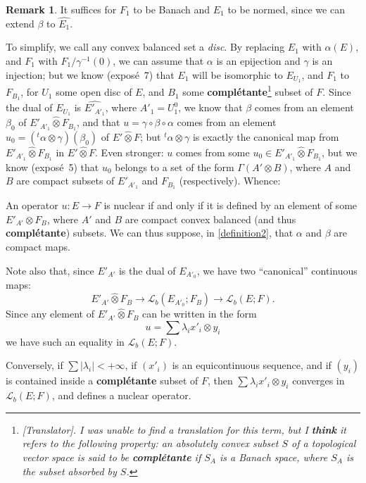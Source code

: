\documentclass{article}
\theoremstyle{plain}
\newenvironment{proposition}[1]
    {\renewcommand\theinnercustomproposition{#1}\innercustomproposition}
    {\endinnercustomproposition}
\theoremstyle{definition}
\newtheorem*{remark}{Remark}
\newcommand{\LL}{\mathcal{L}}
\newcommand{\cotimes}{\widehat{\otimes}}
\newcommand{\transpose}[1]{{}^t\!{#1}}
\newcommand{\oldpage}[1]{\marginpar{\footnotesize$\Big\vert$ \textit{p.~#1}}}
\begin{document}
\begin{remark}
  It suffices for $F_1$ to be Banach and $E_1$ to be normed, since we can extend $\beta$ to $\widehat{E_1}$.
\end{remark}

To simplify, we call any convex balanced set a \emph{disc}.
By replacing $E_1$ with $\alpha(E)$, and $F_1$ with $F_1/\gamma^{-1}(0)$, we can assume that $\alpha$ is an epijection and $\gamma$ is an injection;
but we know (exposé~7) that $E_1$ will be isomorphic to $E_{U_1}$, and $F_1$ to $F_{B_1}$, for $U_1$ some open disc of $E$, and $B_1$ some \textbf{complétante}\footnote{\emph{[Translator]. I was unable to find a translation for this term, but I \textbf{think} it refers to the following property: an absolutely convex subset $S$ of a topological vector space is said to be \textbf{complétante} if $S_A$ is a Banach space, where $S_A$ is the subset absorbed by $S$.}} subset of $F$.
Since the dual of $E_{U_1}$ is $\widehat{E'_{A'_1}}$, where $A'_1=U_1^0$, we know that $\beta$ comes from an element $\beta_0$ of $E'_{A'_1}\cotimes F_{B_1}$, and that $u=\gamma\circ\beta\circ\alpha$ comes from an element $u_0=(\transpose{\alpha}\otimes\gamma)(\beta_0)$ of $E'\cotimes F$;
but $\transpose{\alpha}\otimes\gamma$ is exactly the canonical map from $E'_{A'_1}\cotimes F_{B_1}$ in $E'\cotimes F$.
Even stronger: $u$ comes from some $u_0\in E'_{A'_1}\cotimes F_{B_1}$, but we know (exposé~5) that $u_0$ belongs to a set of the form $\Gamma(A'\otimes B)$, where $A$ and $B$ are compact subsets of $E'_{A'_1}$ and $F_{B_1}$ (respectively).
Whence:

\begin{proposition}{3}
\label{proposition3}
  An operator $u\colon E\to F$ is nuclear if and only if it is defined by an element of some $E'_{A'}\otimes F_B$, where $A'$ and $B$ are compact convex balanced (and thus \textbf{complétante}) subsets.
  We can thus suppose, in \cref{definition2}, that $\alpha$ and $\beta$ are compact maps.
\end{proposition}

Note also that, since $E'_{A'}$ is the dual of $E_{A'_0}$, we have two ``canonical'' continuous maps:
\[
  E'_{A'}\cotimes F_B \to \LL_b(E_{A'_0};F_B) \to \LL_b(E;F).
\]
Since any element of $E'_{A'}\cotimes F_B$ can be written in the form
\[
  u = \sum\lambda_i x'_i\otimes y_i
\]
\oldpage{5}
we have such an equality in $\LL_b(E;F)$.

Conversely, if $\sum|\lambda_i|<+\infty$, if $(x'_i)$ is an equicontinuous sequence, and if $(y_i)$ is contained inside a \textbf{complétante} subset of $F$, then $\sum\lambda_i x'_i\otimes y_i$ converges in $\LL_b(E;F)$, and defines a nuclear operator.
\end{document}
